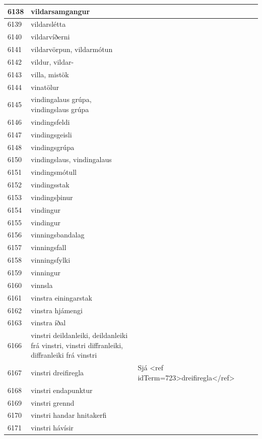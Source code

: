 \begin{longtable}{p{}|p{}|p{}|p{}|p{}}
\hline
6138 & vildarsamgangur &  &  &  \\
\hline
6139 & vildarslétta &  &  &  \\
\hline
6140 & vildarvíðerni &  &  &  \\
\hline
6141 & vildarvörpun, vildarmótun &  &  &  \\
\hline
6142 & vildur, vildar- &  &  &  \\
\hline
6143 & villa, mistök &  &  &  \\
\hline
6144 & vinatölur &  &  &  \\
\hline
6145 & vindingalaus grúpa, vindingslaus grúpa &  &  &  \\
\hline
6146 & vindingsfeldi &  &  &  \\
\hline
6147 & vindingsgeisli &  &  &  \\
\hline
6148 & vindingsgrúpa &  &  &  \\
\hline
6150 & vindingslaus, vindingalaus &  &  &  \\
\hline
6151 & vindingsmótull &  &  &  \\
\hline
6152 & vindingsstak &  &  &  \\
\hline
6153 & vindingsþinur &  &  &  \\
\hline
6154 & vindingur &  &  &  \\
\hline
6155 & vindingur &  &  &  \\
\hline
6156 & vinningsbandalag &  &  &  \\
\hline
6157 & vinningsfall &  &  &  \\
\hline
6158 & vinningsfylki &  &  &  \\
\hline
6159 & vinningur &  &  &  \\
\hline
6160 & vinnsla &  &  &  \\
\hline
6161 & vinstra einingarstak &  &  &  \\
\hline
6162 & vinstra hjámengi &  &  &  \\
\hline
6163 & vinstra íðal &  &  &  \\
\hline
6166 & vinstri deildanleiki, deildanleiki frá vinstri, vinstri diffranleiki, diffranleiki frá vinstri &  &  &  \\
\hline
6167 & vinstri dreifiregla & Sjá <ref idTerm=723>dreifiregla</ref> &  &  \\
\hline
6168 & vinstri endapunktur &  &  &  \\
\hline
6169 & vinstri grennd &  &  &  \\
\hline
6170 & vinstri handar hnitakerfi &  &  &  \\
\hline
6171 & vinstri hávísir &  &  &  \\

\end{longtable}
